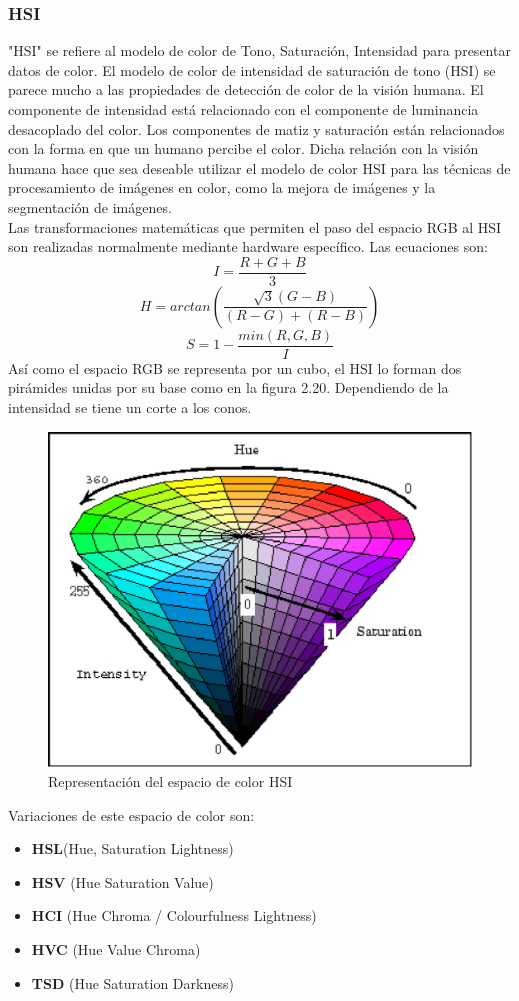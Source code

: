\subsubsection{HSI}
"HSI" se refiere al modelo de color de Tono, Saturación, Intensidad para presentar datos
de color. El modelo de color de intensidad de saturación de tono (HSI) se parece mucho
a las propiedades de detección de color de la visión humana. El componente de intensidad
está relacionado con el componente de luminancia desacoplado del color. Los componentes
de matiz y saturación están relacionados con la forma en que un humano percibe el color.
Dicha relación con la visión humana hace que sea deseable utilizar el modelo de color
HSI para las técnicas de procesamiento de imágenes en color, como la mejora de imágenes
y la segmentación de imágenes.\cite{Article:taiy2000}\\
Las transformaciones matemáticas que permiten el paso del espacio RGB al HSI
son realizadas normalmente mediante hardware específico. Las ecuaciones son:
\begin{equation}
	I=\frac{R+G+B}{3}
\end{equation}
\begin{equation}
	H = arctan \left( \frac{\sqrt{3}(G-B)}{(R-G)+(R-B)} \right)
\end{equation}
\begin{equation}
	S = 1 - \frac{min(R,G,B)}{I}
\end{equation}
Así como el espacio RGB se representa por un cubo, el HSI lo forman dos
pirámides unidas por su base como en la figura 2.20. Dependiendo de la intensidad se tiene un corte a los
conos.
\begin{figure}[h]
	\begin{center}
		\includegraphics[width=0.65 \textwidth]{Contenido/Cuerpo/Capitulo2/Fig11.eps}
		\caption{Representación del espacio de color HSI}
		\label{fig:20}
	\end{center}
\end{figure}
Variaciones de este espacio de color son:
\begin{itemize}
	\item \textbf{HSL}(Hue, Saturation Lightness)
	\item \textbf{HSV} (Hue Saturation Value)
	\item \textbf{HCI} (Hue Chroma / Colourfulness Lightness)
	\item \textbf{HVC} (Hue Value Chroma)
	\item \textbf{TSD} (Hue Saturation Darkness)
\end{itemize}

